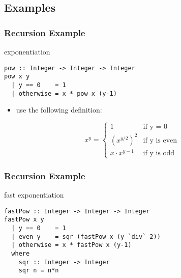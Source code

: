 \documentclass[dvipsnames]{beamer}
\theoremstyle{plain}
\begin{document}
\subsection{Examples}

\begin{frame}[fragile]
  \frametitle{Recursion Example}

  \begin{exampleblock}{exponentiation}
    \begin{lstlisting}
pow :: Integer -> Integer -> Integer
pow x y
  | y == 0    = 1
  | otherwise = x * pow x (y-1)
    \end{lstlisting}
  \end{exampleblock}

  \pause
  \begin{itemize}
    \item use the following definition:
  \end{itemize}
  \[
    x^y =
      \begin{cases}
        1               & \mbox{if y = 0}\\
        {(x^{y/2})}^2   & \mbox{if y is even}\\
        x \cdot x^{y-1} & \mbox{if y is odd}
      \end{cases}
  \]
\end{frame}

\begin{frame}[fragile]
  \frametitle{Recursion Example}

  \begin{exampleblock}{fast exponentiation}
    \begin{lstlisting}
fastPow :: Integer -> Integer -> Integer
fastPow x y
  | y == 0    = 1
  | even y    = sqr (fastPow x (y `div` 2))
  | otherwise = x * fastPow x (y-1)
  where
    sqr :: Integer -> Integer
    sqr n = n*n
    \end{lstlisting}
  \end{exampleblock}
\end{frame}
\end{document}
